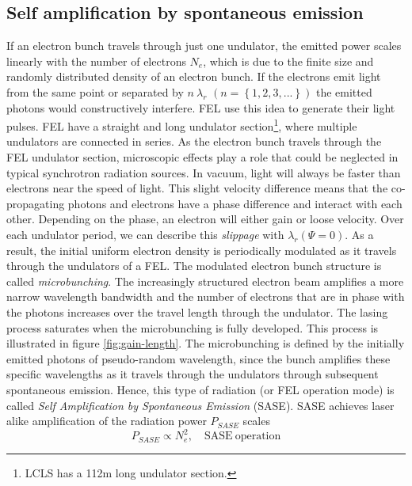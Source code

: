 \subsection{Self amplification by spontaneous emission}\label{sec:sase}
If an electron bunch travels through just one undulator, the emitted power scales linearly with the number of electrons $N_{e}$, which is due to the finite size and randomly distributed density of an electron bunch. If the electrons emit light from the same point or separated by $n\ \lambda_{r}$ $\left(n=\left\{1,2,3,...\right\}\right)$ the emitted photons would constructively interfere. FEL use this idea to generate their light pulses. FEL have a straight and long undulator section\footnote{LCLS has a 112m long undulator section.}, where multiple undulators are connected in series. As the electron bunch travels through the FEL undulator section, microscopic effects play a role that could be neglected in typical synchrotron radiation sources. In vacuum, light will always be faster than electrons near the speed of light. This slight velocity difference means that the co-propagating photons and electrons have a phase difference and interact with each other. Depending on the phase, an electron will either gain or loose velocity. Over each undulator period, we can describe this \textit{slippage} with $\lambda_{r}(\Psi = 0)$. As a result, the initial uniform electron density is periodically modulated as it travels through the undulators of a FEL. The modulated electron bunch structure is called \textit{microbunching}. The increasingly structured electron beam amplifies a more narrow wavelength bandwidth and the number of electrons that are in phase with the photons increases over the travel length through the undulator. The lasing process saturates when the microbunching is fully developed. This process is illustrated in figure \ref{fig:gain-length}.
The microbunching is defined by the initially emitted photons of pseudo-random wavelength, since the bunch amplifies these specific wavelengths as it travels through the undulators through subsequent spontaneous emission.
Hence, this type of radiation (or FEL operation mode) is called \textit{Self Amplification by Spontaneous Emission} (SASE). SASE achieves laser alike amplification of the radiation power $P_{SASE}$ scales \citep[see][p.~61]{Als-Nielson-2011-JWS}
\begin{equation}
P_{SASE} \propto N_{e}^{2},\quad \mathrm{SASE\ operation}
\end{equation}

